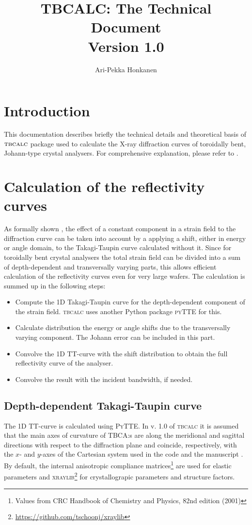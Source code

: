 \documentclass[11pt,a4paper]{article}
\author{Ari-Pekka Honkanen}
\title{TBCALC: The Technical Document\\Version 1.0}
\begin{document}
\maketitle
\section{Introduction}
This documentation describes briefly the technical details and theoretical basis of $\textsc{tbcalc}$ package used to calculate the X-ray diffraction curves of toroidally bent, Johann-type crystal analysers. For comprehensive explanation, please refer to \cite{honkanen2020}.

\section{Calculation of the reflectivity curves}
As formally shown \cite{Honkanen_2016}, the effect of a constant component in a strain field to the diffraction curve can be taken into account by a applying a shift, either in energy or angle domain, to the Takagi-Taupin curve calculated without it. Since for toroidally bent crystal analysers the total strain field can be divided into a sum of depth-dependent and transversally varying parts, this allows efficient calculation of the reflectivity curves even for very large wafers. The calculation is summed up in the following steps:
\begin{itemize}
\item Compute the 1D Takagi-Taupin curve for the depth-dependent component of the strain field. \textsc{tbcalc} uses another Python package \textsc{pyTTE} for this.
\item Calculate distribution the energy or angle shifts due to the transversally varying component. The Johann error can be included in this part.
\item Convolve the 1D TT-curve with the shift distribution to obtain the full reflectivity curve of the analyser.
\item Convolve the result with the incident bandwidth, if needed.
\end{itemize}

\subsection{Depth-dependent Takagi-Taupin curve}
The 1D TT-curve is calculated using \textsc{PyTTE}. In v. 1.0 of \textsc{tbcalc} it is assumed that the main axes of curvature of TBCA:s are along the meridional and sagittal directions with respect to the diffraction plane and coincide, respectively, with the $x$- and $y$-axes of the Cartesian system used in the code and the manuscript \cite{honkanen2020}. By default, the internal anisotropic compliance matrices\footnote{Values from CRC Handbook of Chemistry and Physics, 82nd edition (2001)} are used for elastic parameters and \textsc{xraylib}\footnote{\url{https://github.com/tschoonj/xraylib}} for crystallograpic parameters and structure factors.
\end{document}

